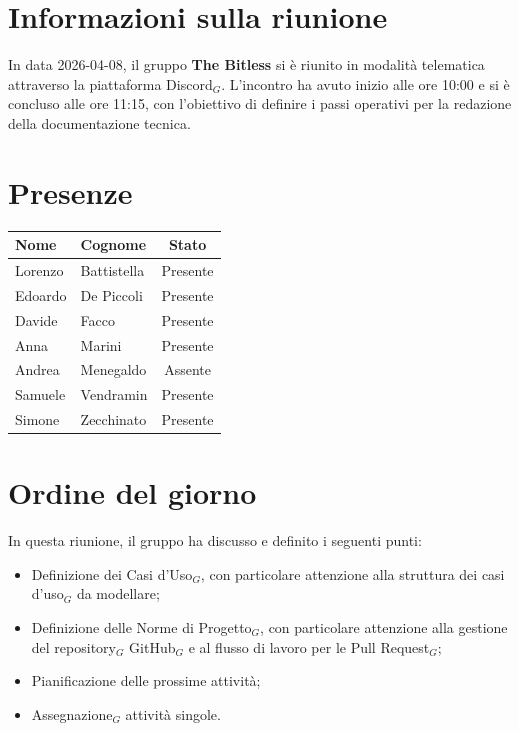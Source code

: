 \documentclass[a4paper, 10pt, colorlinks=true, linkcolor=black, urlcolor=blue, citecolor=blue, hidelinks]{article}
\begin{document}
\newcommand{\titolo}{Verbale interno}
\newcommand{\dataverbale}{2026-04-08}
\newcommand{\dataversione}{2026-04-08}
\newcommand{\versione}{1.0.0}
\newcommand{\stato}{Approvato}
\newcommand{\destinatari}{The Bitless, Prof. Tullio Vardanega, Prof. Riccardo Cardin}
\def\templatedir{../../../../templates}

\begin{titlepage}

\end{titlepage}

\newpage
\tableofcontents 

\newpage
\section{Informazioni sulla riunione}
In data \dataverbale, il gruppo \textbf{The Bitless} si è riunito in modalità telematica attraverso la piattaforma Discord$_G$. L'incontro ha avuto inizio alle ore 10:00 e si è concluso alle ore 11:15, con l'obiettivo di definire i passi operativi per la redazione della documentazione tecnica.

\section{Presenze}
\begin{center}
\begin{tabular}{|l|l|c|}
\hline
\textbf{Nome} & \textbf{Cognome} & \textbf{Stato} \\
\hline
Lorenzo & Battistella & Presente \\
Edoardo & De Piccoli & Presente \\
Davide & Facco & Presente \\
Anna & Marini & Presente \\
Andrea & Menegaldo & Assente \\
Samuele & Vendramin & Presente \\
Simone & Zecchinato & Presente \\
\hline
\end{tabular}
\end{center}

\section{Ordine del giorno}
In questa riunione, il gruppo ha discusso e definito i seguenti punti:
\begin{itemize}
    \item Definizione dei Casi d'Uso$_G$, con particolare attenzione alla struttura dei casi d'uso$_G$ da modellare;
    \item Definizione delle Norme di Progetto$_G$, con particolare attenzione alla gestione del repository$_G$ GitHub$_G$ e al flusso di lavoro per le Pull Request$_G$;
    \item Pianificazione delle prossime attività;
    \item Assegnazione$_G$ attività singole.
\end{itemize}
\end{document}
